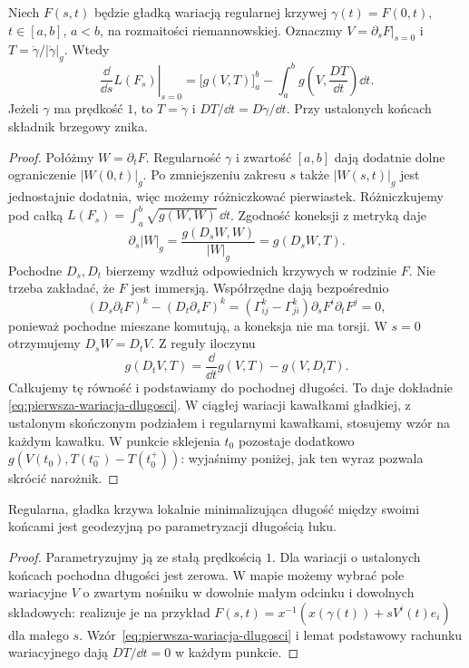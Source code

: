 \begin{twierdzenie}
\label{thm:pierwsza-wariacja-dlugosci}
Niech $F(s,t)$ będzie gładką wariacją regularnej
krzywej $\gamma(t)=F(0,t)$, $t\in[a,b]$, $a<b$,
na rozmaitości riemannowskiej.
Oznaczmy $V=\partial_sF|_{s=0}$ i
$T=\dot\gamma/|\dot\gamma|_g$.
Wtedy
\begin{equation}\label{eq:pierwsza-wariacja-dlugosci}
 \left.\frac{\dd}{\dd s}L(F_s)\right|_{s=0}
  =\bigl[g(V,T)\bigr]_a^b
    -\int_a^b g\!\left(V,\frac{DT}{\dd t}\right)\dd t.
\end{equation}
Jeżeli $\gamma$ ma prędkość $1$, to
$T=\dot\gamma$ i $DT/\dd t=D\dot\gamma/\dd t$.
Przy ustalonych końcach składnik brzegowy znika.
\end{twierdzenie}
\begin{proof}
Połóżmy $W=\partial_tF$. Regularność $\gamma$ i zwartość
$[a,b]$ dają dodatnie dolne ograniczenie $|W(0,t)|_g$.
Po zmniejszeniu zakresu $s$ także $|W(s,t)|_g$ jest
jednostajnie dodatnia, więc możemy różniczkować pierwiastek.
Różniczkujemy
pod całką $L(F_s)=\int_a^b\sqrt{g(W,W)}\,\dd t$.
Zgodność koneksji z metryką daje
\[
 \partial_s|W|_g
 =\frac{g(D_sW,W)}{|W|_g}
 =g(D_sW,T).
\]
Pochodne $D_s,D_t$ bierzemy wzdłuż odpowiednich krzywych
w rodzinie $F$. Nie trzeba zakładać, że $F$ jest immersją.
Współrzędne dają bezpośrednio
\[
 (D_s\partial_tF)^k-(D_t\partial_sF)^k
 =(\Gamma^k_{ij}-\Gamma^k_{ji})
                      \partial_sF^i\partial_tF^j=0,
\]
ponieważ pochodne mieszane komutują, a koneksja nie ma
torsji. W $s=0$ otrzymujemy $D_sW=D_tV$.
Z reguły iloczynu
\[
 g(D_tV,T)=\frac{\dd}{\dd t}g(V,T)-g(V,D_tT).
\]
Całkujemy tę równość i podstawiamy do
pochodnej długości. To daje dokładnie
\eqref{eq:pierwsza-wariacja-dlugosci}.
W ciągłej wariacji kawałkami gładkiej, z ustalonym
skończonym podziałem i regularnymi kawałkami, stosujemy
wzór na każdym kawałku. W punkcie sklejenia $t_0$
pozostaje dodatkowo
$g(V(t_0),T(t_0^-)-T(t_0^+))$:
wyjaśnimy poniżej, jak ten wyraz pozwala skrócić narożnik.
\end{proof}

\begin{wniosek}
\label{cor:minimalna-geodezyjna}
Regularna, gładka krzywa lokalnie minimalizująca
długość między swoimi końcami jest geodezyjną
po parametryzacji długością łuku.
\end{wniosek}
\begin{proof}
Parametryzujmy ją ze stałą prędkością $1$.
Dla wariacji o ustalonych końcach pochodna
długości jest zerowa. W mapie możemy wybrać
pole wariacyjne $V$ o zwartym nośniku
w dowolnie małym odcinku i dowolnych
składowych: realizuje je na przykład
$F(s,t)=x^{-1}(x(\gamma(t))+sV^i(t)e_i)$
dla małego $s$. Wzór~\eqref{eq:pierwsza-wariacja-dlugosci}
i lemat podstawowy rachunku wariacyjnego
dają $DT/\dd t=0$ w każdym punkcie.
\end{proof}

